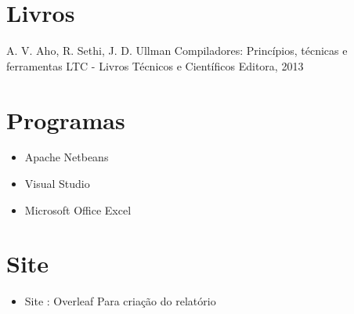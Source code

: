 \printbibheading[heading=bibnumbered,title={Referências}]



\section{Livros}
A. V. Aho, R. Sethi, J. D. Ullman
Compiladores: Princípios, técnicas e ferramentas
LTC - Livros Técnicos e Científicos Editora, 2013
\section{Programas}
\begin{itemize}
\item Apache Netbeans
\item Visual Studio
\item Microsoft Office Excel
\end{itemize}
\section{Site}
\begin{itemize}
\item Site : Overleaf Para criação do relatório
\end{itemize}
\printbibliography
\printbibliography